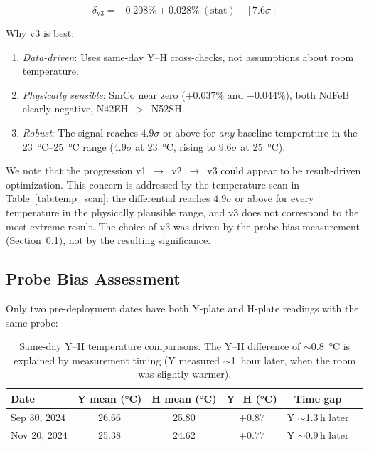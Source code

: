 \documentclass[11pt,letterpaper]{article}
\newcommand{\ndfeb}{NdFeB}
\begin{document}
\begin{equation*}
    \delta_\mathrm{v3} = -0.208\% \pm 0.028\%~(\mathrm{stat}) \quad [7.6\sigma]
\end{equation*}

Why v3 is best:
\begin{enumerate}
    \item \emph{Data-driven}: Uses same-day Y--H cross-checks, not
    assumptions about room temperature.
    \item \emph{Physically sensible}: SmCo near zero ($+0.037\%$ and
    $-0.044\%$), both \ndfeb{} clearly negative, N42EH~$>$~N52SH.
    \item \emph{Robust}: The signal reaches $4.9\sigma$ or above for
    \emph{any} baseline temperature in the \SIrange{23}{25}{\celsius}
    range ($4.9\sigma$ at \SI{23}{\celsius}, rising to $9.6\sigma$ at
    \SI{25}{\celsius}).
\end{enumerate}

We note that the progression v1~$\to$~v2~$\to$~v3 could appear to be
result-driven optimization. This concern is addressed by the temperature
scan in Table~\ref{tab:temp_scan}: the differential reaches $4.9\sigma$ or above for
every temperature in the physically plausible range, and v3 does not
correspond to the most extreme result. The choice of v3 was driven by
the probe bias measurement (Section~\ref{sec:probe_bias}), not by the
resulting significance.

\subsection{Probe Bias Assessment}
\label{sec:probe_bias}

Only two pre-deployment dates have both Y-plate and H-plate readings with the
same probe:

\begin{table}[H]
\centering
\caption{Same-day Y--H temperature comparisons. The Y--H difference of
$\sim$\SI{0.8}{\celsius} is explained by measurement timing (Y measured
$\sim$1~hour later, when the room was slightly warmer).}
\label{tab:probe_bias}
\begin{tabular}{@{}lccccc@{}}
\toprule
\textbf{Date} & Y mean (\si{\celsius}) & H mean (\si{\celsius}) & Y$-$H (\si{\celsius}) & Time gap \\
\midrule
Sep 30, 2024 & 26.66 & 25.80 & $+0.87$ & Y $\sim$1.3\,h later \\
Nov 20, 2024 & 25.38 & 24.62 & $+0.77$ & Y $\sim$0.9\,h later \\
\bottomrule
\end{tabular}
\end{table}
\end{document}
